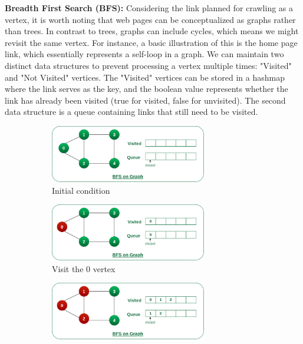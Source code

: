 \textbf{Breadth First Search (BFS):} Considering the link planned for crawling as a vertex, it is worth noting that web pages can be conceptualized as graphs rather than trees. In contrast to trees, graphs can include cycles, which means we might revisit the same vertex. For instance, a basic illustration of this is the home page link, which essentially represents a self-loop in a graph. We can maintain two distinct data structures to prevent processing a vertex multiple times: "Visited" and "Not Visited" vertices. The "Visited" vertices can be stored in a hashmap where the link serves as the key, and the boolean value represents whether the link has already been visited (true for visited, false for unvisited). The second data structure is a queue containing links that still need to be visited.

\begin{figure}[ht] 
  \begin{subfigure}[b]{0.5\textwidth}
    \centering
    \includegraphics[width=0.75\textwidth]{figures/bfs-1.png} 
    \caption{Initial condition} 
    \label{fig:bfs-a} 
    \vspace{4ex}
  \end{subfigure}%
  \begin{subfigure}[b]{0.5\textwidth}
    \centering
    \includegraphics[width=0.75\textwidth]{figures/bfs-2.png} 
    \caption{Visit the 0 vertex}  
    \label{fig:bfs-b} 
    \vspace{4ex}
  \end{subfigure} 
  \begin{subfigure}[b]{0.5\textwidth}
    \centering
    \includegraphics[width=0.75\textwidth]{figures/bfs-3.png} 

\end{subfigure}
\end{figure}
